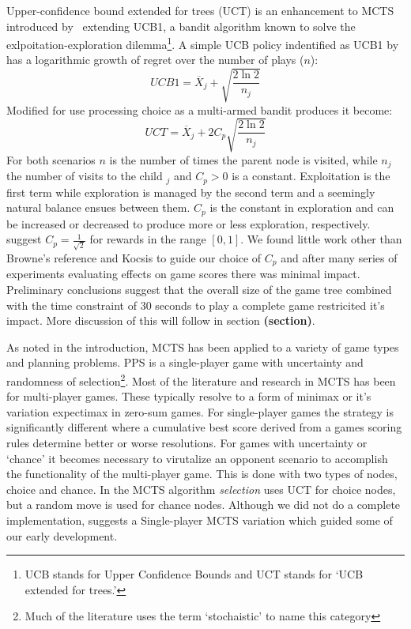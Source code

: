 \documentclass[letterpaper]{article}
\begin{document}
Upper-confidence bound extended for trees (UCT) is an enhancement to MCTS introduced by~\cite{kocsis2006improved} extending UCB1, a bandit algorithm known to solve the exlpoitation-exploration dilemma\footnote{UCB stands for Upper Confidence Bounds and UCT stands for `UCB extended for trees.'}. A simple UCB policy indentified as UCB1 by~\cite{auer2002finite} has a logarithmic growth of regret over the number of plays ($n$):
\begin{equation}
UCB1 = \overline{X}_j + \sqrt{\frac{2\ln{2}}{n_j}}
\end{equation}
Modified for use processing choice as a multi-armed bandit produces it become:
\begin{equation}
UCT = \overline{X}_j + 2C_p\sqrt{\frac{2\ln{2}}{n_j}}
\end{equation}
For both scenarios $n$ is the number of times the parent node is visited, while $n_j$ the number of visits to the child $_j$ and $C_p > 0$ is a constant. Exploitation is the first term while exploration is managed by the second term and a seemingly natural balance ensues between them. $C_p$ is the constant in exploration and can be increased or decreased to produce more or less exploration, respectively. ~\cite{kocsis2006improved} suggest $C_p = \frac{1}{\sqrt{2}}$ for rewards in the range $[0,1]$. We found little work other than Browne's reference and Kocsis to guide our choice of $C_p$ and after many series of experiments evaluating effects on game scores there was minimal impact. Preliminary conclusions  suggest that the overall size of the game tree combined with the time constraint of 30 seconds to play a complete game restricited it's impact. More discussion of this will follow in section {\bf(section)}.

As noted in the introduction, MCTS has been applied to a variety of game types and planning problems. PPS is a single-player game with uncertainty and randomness of selection\footnote{Much of the literature uses the term `stochaistic' to name this category}. Most of the literature and research in MCTS has been for multi-player games. These typically resolve to a form of minimax or it's variation expectimax in zero-sum games. For single-player games the strategy is significantly different where a cumulative best score derived from a games scoring rules determine better or worse resolutions. For games with uncertainty or `chance' it becomes necessary to virutalize an opponent scenario to accomplish the functionality of the multi-player game. This is done with two types of nodes, choice and chance. In the MCTS algorithm \emph{selection} uses UCT for choice nodes, but a random move is used for chance nodes. Although we did not do a complete implementation, \cite{schadd2012single} suggests a Single-player MCTS variation which guided some of our early development.
\end{document}
